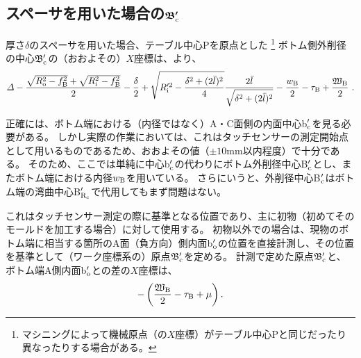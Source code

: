 \subsection[スペーサを用いた場合の\texorpdfstring{$\mathfrak B_\text c'$}{Bc'}]
           {スペーサを用いた場合の$\boldsymbol{\mathfrak B_\text c'}$}
厚さ$\delta$のスペーサを用いた場合、テーブル中心Pを原点とした
\footnote{マシニングによって機械原点（の$X$座標）がテーブル中心Pと同じだったり異なったりする場合がある。}\relax
ボトム側外削径の中心$\mathfrak B_\text c'$の（おおよその）$X$座標は、より、
\begin{align*}
  \varDelta-\frac{\sqrt{R_\text o^2-f_\text B^2}+\sqrt{R_\text i^2-f_\text B^2}}2-\frac\delta2+\sqrt{R_\text i'^2-\frac{\delta^2+(2\bar l)^2}4}\frac{2\bar l}{\sqrt{\delta^2+(2\bar l)^2}}
  -\frac{w_\text B}2-\tau_\text B+\frac{\mathfrak W_\text B}2\ .
\end{align*}
\begin{hosokubox}
正確には、ボトム端における（内径ではなく）A・C面側の内面中心b$_\text c'$を見る必要がある。
しかし実際の作業においては、これはタッチセンサーの測定開始点として用いるものであるため、おおよその値（$\pm10$mm以内程度）で十分である。
そのため、ここでは単純に中心b$_\text c'$の代わりにボトム外削径中心B$_\text c'$とし、またボトム端における内径$w_\text B$を用いている。
さらにいうと、外削径中心B$_\text c'$はボトム端の湾曲中心B$_{\text R_\text c}'$で代用してもまず問題はない。
\end{hosokubox}
これはタッチセンサー測定の際に基準となる位置であり、主に初物（初めてそのモールドを加工する場合）に対して使用する。
初物以外での場合は、現物のボトム端に相当する箇所のA面（負方向）側内面b$_\text o'$の位置を直接計測し、その位置を基準として（ワーク座標系の）原点$\mathfrak B_\text c'$を定める。
計測で定めた原点$\mathfrak B_\text c'$と、ボトム端A側内面b$_\text o'$との差の$X$座標は、
\begin{align*}
  -\left(\frac{\mathfrak W_\text B}2-\tau_\text B+\mu\right).
\end{align*}


